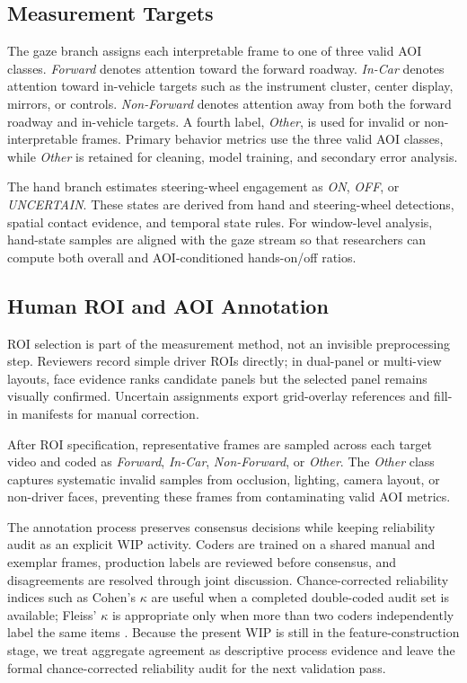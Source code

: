 \documentclass[sigconf,review,anonymous]{acmart}
\begin{document}
\subsection{Measurement Targets}

The gaze branch assigns each interpretable frame to one of three valid
AOI classes. \textit{Forward} denotes attention toward the forward
roadway. \textit{In-Car} denotes attention toward in-vehicle targets such
as the instrument cluster, center display, mirrors, or controls.
\textit{Non-Forward} denotes attention away from both the forward roadway
and in-vehicle targets. A fourth label, \textit{Other}, is used for
invalid or non-interpretable frames. Primary behavior metrics use the
three valid AOI classes, while \textit{Other} is retained for cleaning,
model training, and secondary error analysis.

The hand branch estimates steering-wheel engagement as \textit{ON},
\textit{OFF}, or \textit{UNCERTAIN}. These states are derived from hand
and steering-wheel detections, spatial contact evidence, and temporal
state rules. For window-level analysis, hand-state samples are aligned
with the gaze stream so that researchers can compute both overall and
AOI-conditioned hands-on/off ratios.

\subsection{Human ROI and AOI Annotation}

ROI selection is part of the measurement method, not an invisible
preprocessing step. Reviewers record simple driver ROIs directly; in
dual-panel or multi-view layouts, face evidence ranks candidate panels
but the selected panel remains visually confirmed. Uncertain assignments
export grid-overlay references and fill-in manifests for manual
correction.

After ROI specification, representative frames are sampled across each
target video and coded as \textit{Forward}, \textit{In-Car},
\textit{Non-Forward}, or \textit{Other}. The \textit{Other} class
captures systematic invalid samples from occlusion, lighting, camera
layout, or non-driver faces, preventing these frames from contaminating
valid AOI metrics.

The annotation process preserves consensus decisions while keeping
reliability audit as an explicit WIP activity. Coders are trained on a
shared manual and exemplar frames, production labels are reviewed before
consensus, and disagreements are resolved through joint discussion.
Chance-corrected reliability indices such as Cohen's \(\kappa\)
\cite{cohen1960coefficient} are useful when a completed double-coded
audit set is available; Fleiss' \(\kappa\) is appropriate only when more
than two coders independently label the same items \cite{fleiss1971}.
Because the present WIP is still in the feature-construction stage, we
treat aggregate agreement as descriptive process evidence and leave the
formal chance-corrected reliability audit for the next validation pass.
\end{document}
